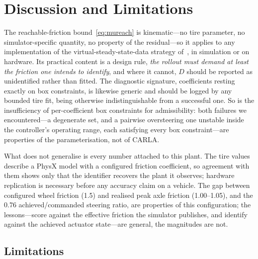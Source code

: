 \section{Discussion and Limitations}
\label{sec:disc}

The reachable-friction bound~\eqref{eq:mureach} is kinematic---no tire
parameter, no simulator-specific quantity, no property of the residual---so it
applies to any implementation of the virtual-steady-state-data strategy
of~\cite{ontrack2025}, in simulation or on hardware. Its practical content is
a design rule, \emph{the rollout must demand at least the friction one intends
to identify}, and where it cannot, $D$ should be reported as unidentified
rather than fitted. The diagnostic signature, coefficients resting exactly on box constraints, is
likewise generic and should be logged by any bounded tire fit, being otherwise
indistinguishable from a successful one. So is the insufficiency of
per-coefficient box constraints for admissibility: both failures we
encountered---a degenerate set, and a pairwise oversteering one unstable inside
the controller's operating range, each satisfying every box constraint---are
properties of the parameterisation, not of CARLA.

What does not generalise is every number attached to this plant. The tire
values describe a PhysX model with a configured friction coefficient, so
agreement with them shows only that the identifier recovers the plant it
observes; hardware replication is necessary before any accuracy claim on a
vehicle. The gap between configured wheel
friction (\num{1.5}) and realised peak axle friction (\numrange{1.00}{1.05}),
and the \num{0.76} achieved/commanded steering ratio, are properties of this
configuration; the lessons---score against the effective friction the simulator
publishes, and identify against the achieved actuator state---are general, the
magnitudes are not.

\subsection{Limitations}
\label{subsec:limits}

